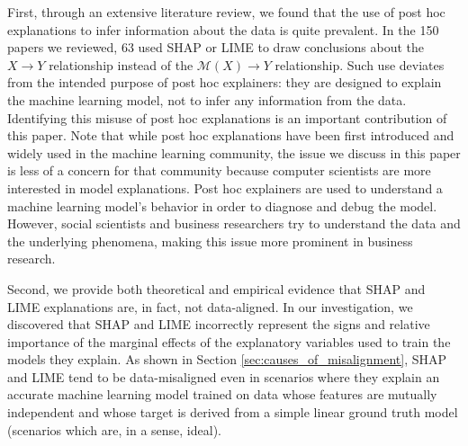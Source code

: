 \documentclass[12pt]{article}  %
\begin{document}
     First, through an extensive literature review, we found that the use of post hoc explanations to infer information about the data is quite prevalent. In the 150 papers we reviewed, 63 used SHAP or LIME to draw conclusions about the $X\rightarrow Y$ relationship instead of the $\mathcal{M}(X)\rightarrow Y$ relationship. Such use deviates from the intended purpose of post hoc explainers: they are designed to explain the machine learning model, not to infer any information from the data. Identifying this misuse of post hoc explanations is an important contribution of this paper. Note that while post hoc explanations have been first introduced and widely used in the machine learning community, the issue we discuss in this paper is less of a concern for that community because computer scientists are more interested in model explanations. Post hoc explainers are used to understand a machine learning model's behavior in order to diagnose and debug the model. However, social scientists and business researchers try to understand the data and the underlying phenomena, making this issue more prominent in business research.


    Second, we provide both theoretical and empirical evidence that SHAP and LIME explanations are, in fact, not data-aligned. In our investigation, we discovered that SHAP and LIME incorrectly represent the signs and relative importance of the marginal effects of the explanatory variables used to train the models they explain. As shown in Section \ref{sec:causes_of_misalignment}, SHAP and LIME tend to be data-misaligned even in scenarios where they explain an accurate machine learning model trained on data whose features are mutually independent and whose target is derived from a simple linear ground truth model (scenarios which are, in a sense, ideal).%
    
\end{document}
